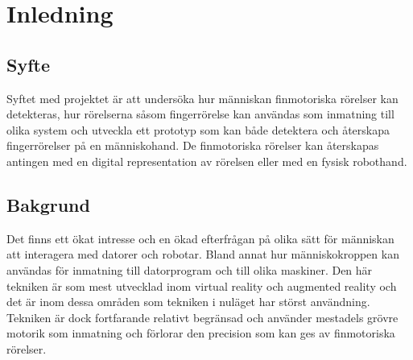 \documentclass[a4paper]{article}
\begin{document}




\begin{abstract}

\end{abstract}

\begin{otherlanguage}{english}
    \begin{abstract}
    \end{abstract}
\end{otherlanguage}

\tableofcontents

\newpage
{}

\begin{sloppypar}

    \section{Inledning}
    \subsection{Syfte}
    Syftet med projektet är att undersöka hur människan finmotoriska rörelser kan detekteras, hur rörelserna såsom fingerrörelse kan användas som inmatning till olika system
    och utveckla ett prototyp som kan både detektera och återskapa fingerrörelser på en människohand.
    De finmotoriska rörelser kan återskapas antingen med en digital representation av rörelsen eller med en fysisk robothand.
    \subsection{Bakgrund}
    Det finns ett ökat intresse och en ökad efterfrågan på olika sätt för människan att interagera med datorer och robotar.
    Bland annat hur människokroppen kan användas för inmatning till datorprogram och till olika maskiner.
    Den här tekniken är som mest utvecklad inom virtual reality och augmented reality och det är inom dessa områden som tekniken i nuläget har störst användning.
    Tekniken är dock fortfarande relativt begränsad och använder mestadels grövre motorik som inmatning och förlorar den precision som kan ges av finmotoriska rörelser.



\end{sloppypar}
\end{document}
